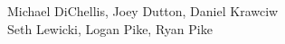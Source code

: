 \documentclass[preview]{standalone}
\begin{document}
\begin{center}
Michael DiChellis, Joey Dutton, Daniel Krawciw\\Seth Lewicki, Logan Pike, Ryan Pike
\end{center}
\end{document}
